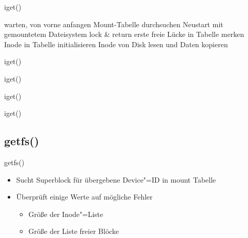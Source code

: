 \documentclass{beamer}
\begin{document}
\begin{frame}{iget()}
    \begin{algorithmic}[1]
                    \State warten, von vorne anfangen
                \EndIf
                    \State Mount-Tabelle durchsuchen
                    \State Neustart mit gemountetem Dateisystem
                \EndIf
                \State lock \& return
            \EndIf
            \State erste freie Lücke in Tabelle merken
        \EndFor
        \State Inode in Tabelle initialisieren
        \State Inode von Disk lesen und Daten kopieren
    \end{algorithmic}
\end{frame}

\begin{frame}{iget()}
\end{frame}

\begin{frame}{iget()}
\end{frame}

\begin{frame}{iget()}
\end{frame}

\begin{frame}{iget()}
\end{frame}




\subsection{getfs()}

\begin{frame}{getfs()}
    \begin{itemize}
        \item Sucht Superblock für übergebene Device"=ID in mount Tabelle

        \bigskip

        \item Überprüft einige Werte auf mögliche Fehler
            \begin{itemize}
                \item Größe der Inode"=Liste
                \item Größe der Liste freier Blöcke
            \end{itemize}
    \end{itemize}
\end{frame}
\end{document}
